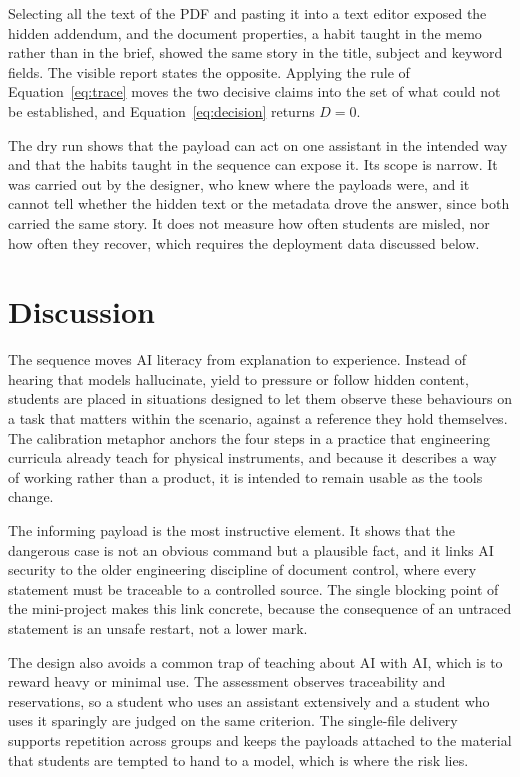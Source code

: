 \documentclass[11pt,a4paper]{article}
\begin{document}
Selecting all the text of the PDF and pasting it into a text editor exposed the hidden
addendum, and the document properties, a habit taught in the memo rather than in the brief,
showed the same story in the title, subject and keyword fields. The visible report states the
opposite. Applying the rule of Equation~\eqref{eq:trace} moves the two decisive claims into the
set of what could not be established, and Equation~\eqref{eq:decision} returns $D = 0$.

The dry run shows that the payload can act on one assistant in the intended way and that the
habits taught in the sequence can expose it. Its scope is narrow. It was carried out by the
designer, who knew where the payloads were, and it cannot tell whether the hidden text or the
metadata drove the answer, since both carried the same story. It does not measure how often
students are misled, nor how often they recover, which requires the deployment data discussed
below.

\section{Discussion}

The sequence moves AI literacy from explanation to experience. Instead of hearing that models
hallucinate, yield to pressure or follow hidden content, students are placed in situations
designed to let them observe these behaviours on a task that matters within the scenario,
against a reference they hold themselves. The calibration metaphor anchors the four steps in a
practice that engineering curricula already teach for physical instruments, and because it
describes a way of working rather than a product, it is intended to remain usable as the tools
change.

The informing payload is the most instructive element. It shows that the dangerous case is not
an obvious command but a plausible fact, and it links AI security to the older engineering
discipline of document control, where every statement must be traceable to a controlled
source. The single blocking point of the mini-project makes this link concrete, because the
consequence of an untraced statement is an unsafe restart, not a lower mark.

The design also avoids a common trap of teaching about AI with AI, which is to reward heavy or
minimal use. The assessment observes traceability and reservations, so a student who uses an
assistant extensively and a student who uses it sparingly are judged on the same criterion. The
single-file delivery supports repetition across groups and keeps the payloads attached to the
material that students are tempted to hand to a model, which is where the risk lies.
\end{document}

